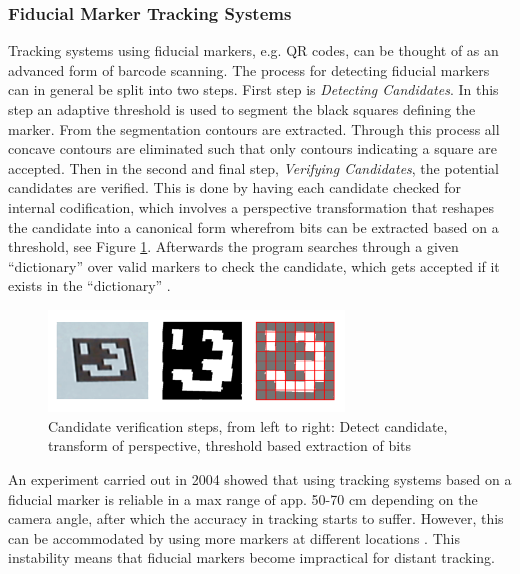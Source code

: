 \subsubsection{Fiducial Marker Tracking Systems}
Tracking systems using fiducial markers, e.g. QR codes, can be thought of as an advanced form of barcode scanning. The process for detecting fiducial markers can in general be split into two steps. First step is \textit{Detecting Candidates}. In this step an adaptive threshold is used to segment the black squares defining the marker. From the segmentation contours are extracted. Through this process all concave contours are eliminated such that only contours indicating a square are accepted. Then in the second and final step, \textit{Verifying Candidates}, the potential candidates are verified. This is done by having each candidate checked for internal codification, which involves a perspective transformation that reshapes the candidate into a canonical form wherefrom bits can be extracted based on a threshold, see Figure \ref{fig:fiducial}. Afterwards the program searches through a  given “dictionary” over valid markers to check the candidate, which gets accepted if it exists in the “dictionary” \cite{Young}.

\begin{figure}[h!]
    \centering
    \includegraphics[width=0.7\textwidth]{figures/Fiducial.png}
    \caption{Candidate verification steps, from left to right: Detect candidate, transform of perspective, threshold based extraction of bits \cite{Young}}\label{fig:fiducial}
\end{figure}

An experiment carried out in 2004 showed that using tracking systems based on a fiducial marker is reliable in a max range of app. 50-70 cm depending on the camera angle, after which the accuracy in tracking starts to suffer. However, this can be accommodated by using more markers at different locations \cite{Abawi2004}. This instability means that fiducial markers become impractical for distant tracking.

